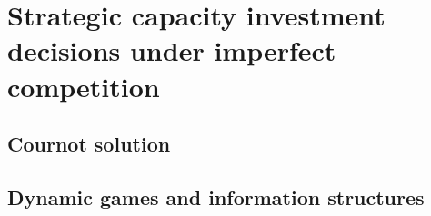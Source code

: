 \section{Strategic capacity investment decisions under imperfect competition}

\subsection{Cournot solution}

\subsection{Dynamic games and information structures}

